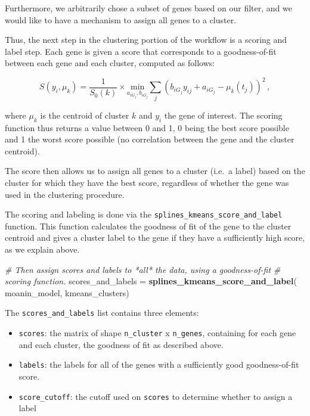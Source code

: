 \documentclass[9pt,a4paper,]{extarticle}
\newenvironment{Shaded}{\begin{snugshade}}{\end{snugshade}}
\newcommand{\CommentTok}[1]{\textcolor[rgb]{0.56,0.35,0.01}{\textit{#1}}}
\newcommand{\KeywordTok}[1]{\textcolor[rgb]{0.13,0.29,0.53}{\textbf{#1}}}
\newcommand{\NormalTok}[1]{#1}
\newcommand{\StringTok}[1]{\textcolor[rgb]{0.31,0.60,0.02}{#1}}
\begin{document}
Furthermore, we arbitrarily chose a subset of genes based on our filter, and we would
like to have a mechanism to assign all genes to a cluster.

Thus, the next step in the clustering portion of the workflow is a scoring and label step. Each gene is given a score that
corresponds to a goodness-of-fit between each gene and each cluster, computed
as follows:

\[
S(y_i, \mu_k) =  \frac{1}{S_0(k)} \times \underset{a_{iG_j}, b_{iG_j}}{\text{min}}\sum_{j}
  {\left(b_{iG_j}y_{ij} + a_{iG_j}
   - \mu_k(t_j)\right)}^2 \,,
\]

where \(\mu_k\) is the centroid of cluster \(k\) and \(y_i\) the gene of interest.
The scoring function thus returns a value between 0 and 1, 0 being the best
score possible and 1 the worst score possible (no correlation between the gene
and the cluster centroid).

The score then allows us to assign all genes to a cluster (i.e.~a label) based on the cluster for which they have the best score, regardless of whether the gene was used in the clustering procedure.

The scoring and labeling is done via the \texttt{splines\_kmeans\_score\_and\_label}
function. This function calculates the goodness of fit of the gene to the
cluster centroid and gives a cluster label to the gene if they have a sufficiently high score, as we explain above.

\begin{Shaded}
\begin{Highlighting}[]
\CommentTok{# Then assign scores and labels to *all* the data, using a goodness-of-fit}
\CommentTok{# scoring function.}
\NormalTok{scores_and_labels =}\StringTok{ }\KeywordTok{splines_kmeans_score_and_label}\NormalTok{(}
\NormalTok{    moanin_model, kmeans_clusters)}
\end{Highlighting}
\end{Shaded}

The \texttt{scores\_and\_labels} list contains three elements:

\begin{itemize}
\tightlist
\item
  \texttt{scores}: the matrix of shape \texttt{n\_cluster} x \texttt{n\_genes},
  containing for each gene and each cluster, the goodness of fit as
  described above.
\item
  \texttt{labels}: the labels for all of the genes with a
  sufficiently good goodness-of-fit score.
\item
  \texttt{score\_cutoff}: the cutoff used on \texttt{scores} to determine whether to
  assign a label
\end{itemize}
\end{document}
